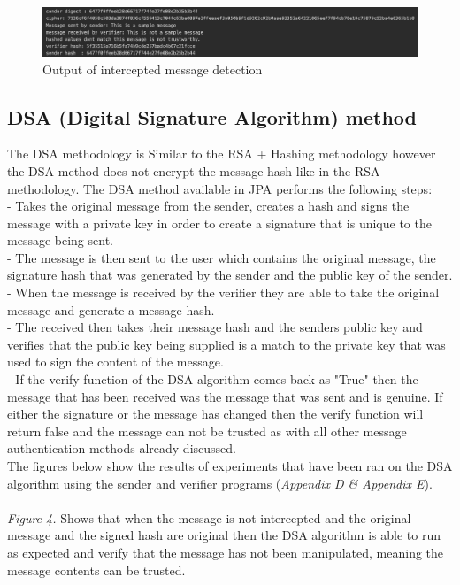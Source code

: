 \documentclass[a4paper, twoside, 11pt]{article}
\begin{document}
\begin{figure}[H]
	\centering
	\includegraphics[scale=0.5]{Images/interceptedMessage.png}
  \caption{Output of intercepted message detection}
\end{figure}

\subsection{DSA (Digital Signature Algorithm) method}
The DSA methodology is Similar to the RSA + Hashing methodology however the DSA method does not encrypt the message hash like in the RSA methodology. The DSA method available in JPA performs the following steps:\\
 - Takes the original message from the sender, creates a hash and signs the message with a private key in order to create a signature that is unique to the message being sent.\\
- The message is then sent to the user which contains the original message, the signature hash that was generated by the sender and the public key of the sender.\\
- When the message is received by the verifier they are able to take the original message and generate a message hash.\\
- The received then takes their message hash and the senders public key and verifies that the public key being supplied is a match to the private key that was used to sign the content of the message.\\
- If the verify function of the DSA algorithm comes back as "True" then the message that has been received was the message that was sent and is genuine. If either the signature or the message has changed then the verify function will return false and the message can not be trusted as with all other message authentication methods already discussed. \\

The figures below show the results of experiments that have been ran on the DSA algorithm using the sender and verifier programs (\textit{Appendix D \& Appendix E}).\\
\\
\textit{Figure 4.} Shows that when the message is not intercepted and the original message and the signed hash are original then the DSA algorithm is able to run as expected and verify that the message has not been manipulated, meaning the message contents can be trusted.
\end{document}
